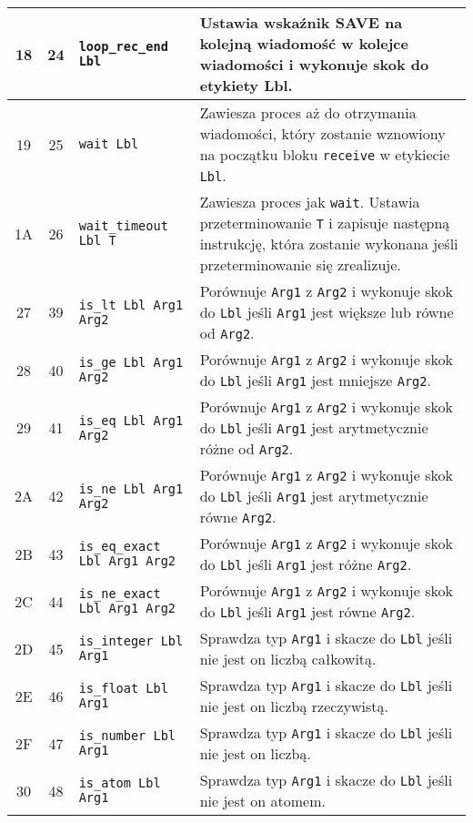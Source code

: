 \begin{longtable}{|c|c|p{5cm}|p{7cm}|}
\hline
18 & 24 & \texttt{loop\_rec\_end Lbl} & Ustawia wskaźnik \textbf{SAVE} na kolejną wiadomość w kolejce wiadomości i wykonuje skok do etykiety \textbf{Lbl}. \\
\hline
19 & 25 & \texttt{wait Lbl} & Zawiesza proces aż do otrzymania wiadomości, który zostanie wznowiony na początku bloku \texttt{receive} w etykiecie \texttt{Lbl}.\\
\hline
1A & 26 & \texttt{wait\_timeout Lbl T} & Zawiesza proces jak \texttt{wait}. Ustawia przeterminowanie \texttt{T} i zapisuje następną instrukcję, która zostanie wykonana jeśli przeterminowanie się zrealizuje.\\
\hline
27 & 39 & \texttt{is\_lt Lbl Arg1 Arg2} & Porównuje \texttt{Arg1} z \texttt{Arg2} i wykonuje skok do \texttt{Lbl} jeśli \texttt{Arg1} jest większe lub równe od \texttt{Arg2}.\\
\hline
28 & 40 & \texttt{is\_ge Lbl Arg1 Arg2} & Porównuje \texttt{Arg1} z \texttt{Arg2} i wykonuje skok do \texttt{Lbl} jeśli \texttt{Arg1} jest mniejsze \texttt{Arg2}.\\
\hline
29 & 41 & \texttt{is\_eq Lbl Arg1 Arg2} & Porównuje \texttt{Arg1} z \texttt{Arg2} i wykonuje skok do \texttt{Lbl} jeśli \texttt{Arg1} jest arytmetycznie różne od \texttt{Arg2}.\\
\hline
2A & 42 & \texttt{is\_ne Lbl Arg1 Arg2} & Porównuje \texttt{Arg1} z \texttt{Arg2} i wykonuje skok do \texttt{Lbl} jeśli \texttt{Arg1} jest arytmetycznie równe \texttt{Arg2}.\\
\hline
2B & 43 & \texttt{is\_eq\_exact Lbl Arg1 Arg2} & Porównuje \texttt{Arg1} z \texttt{Arg2} i wykonuje skok do \texttt{Lbl} jeśli \texttt{Arg1} jest różne \texttt{Arg2}.\\
\hline
2C & 44 & \texttt{is\_ne\_exact Lbl Arg1 Arg2} & Porównuje \texttt{Arg1} z \texttt{Arg2} i wykonuje skok do \texttt{Lbl} jeśli \texttt{Arg1} jest równe \texttt{Arg2}.\\
\hline
2D & 45 & \texttt{is\_integer Lbl Arg1} & Sprawdza typ \texttt{Arg1} i skacze do \texttt{Lbl} jeśli nie jest on liczbą całkowitą.\\
\hline
2E & 46 & \texttt{is\_float Lbl Arg1} & Sprawdza typ \texttt{Arg1} i skacze do \texttt{Lbl} jeśli nie jest on liczbą rzeczywistą.\\
\hline
2F & 47 & \texttt{is\_number Lbl Arg1} & Sprawdza typ \texttt{Arg1} i skacze do \texttt{Lbl} jeśli nie jest on liczbą.\\
\hline
30 & 48 & \texttt{is\_atom Lbl Arg1} & Sprawdza typ \texttt{Arg1} i skacze do \texttt{Lbl} jeśli nie jest on atomem.\\

\end{longtable}
